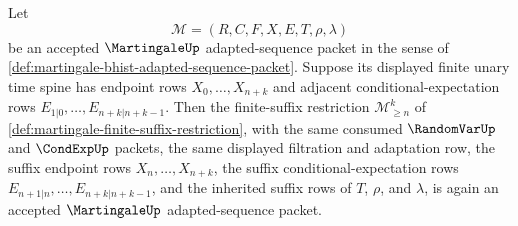 \begin{theorem}
\label{thm:martingale-finite-suffix-restriction-carrier}
Let
$$
\mathcal{M}=(R,C,F,X,E,T,\rho,\lambda)
$$
be an accepted $\MartingaleUp$ adapted-sequence packet in the sense of \autoref{def:martingale-bhist-adapted-sequence-packet}. Suppose its displayed finite unary time spine has endpoint rows $X_0,\ldots,X_{n+k}$ and adjacent conditional-expectation rows $E_{1|0},\ldots,E_{n+k|n+k-1}$. Then the finite-suffix restriction $\mathcal{M}_{\ge n}^{k}$ of \autoref{def:martingale-finite-suffix-restriction}, with the same consumed $\RandomVarUp$ and $\CondExpUp$ packets, the same displayed filtration and adaptation row, the suffix endpoint rows $X_n,\ldots,X_{n+k}$, the suffix conditional-expectation rows $E_{n+1|n},\ldots,E_{n+k|n+k-1}$, and the inherited suffix rows of $T$, $\rho$, and $\lambda$, is again an accepted $\MartingaleUp$ adapted-sequence packet.
\end{theorem}
